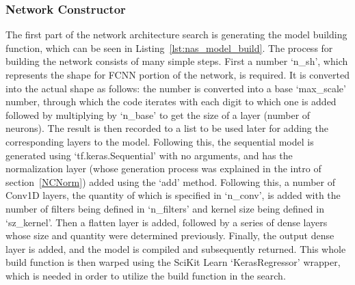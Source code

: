 \documentclass[12pt,letterpaper,oneside,reqno]{book}
\theoremstyle{plain}
\theoremstyle{definition}
\theoremstyle{plain}
\theoremstyle{remark}
\theoremstyle{plain}
\theoremstyle{definition}
\theoremstyle{plain}
\begin{document}
\subsubsection{Network Constructor}
The first part of the network architecture search is generating the model building function, which can be seen in Listing~\ref{lst:nas_model_build}. The process for building the network consists of many simple steps. First a number `n\_sh', which represents the shape for FCNN portion of the network, is required. It is converted into the actual shape as follows: the number is converted into a base `max\_scale' number, through which the code iterates with each digit to which one is added followed by multiplying by `n\_base' to get the size of a layer (number of neurons). The result is then recorded to a list to be used later for adding the corresponding layers to the model. Following this, the sequential model is generated using `tf.keras.Sequential' with no arguments, and has the normalization layer (whose generation process was explained in the intro of section~\ref{NCNorm}) added using the `add' method. Following this, a number of Conv1D layers, the quantity of which is specified in `n\_conv', is added with the number of filters being defined in `n\_filters' and kernel size being defined in `sz\_kernel'. Then a flatten layer is added, followed by a series of dense layers whose size and quantity were determined previously. Finally, the output dense layer is added, and the model is compiled and subsequently returned. This whole build function is then warped using the SciKit Learn `KerasRegressor' wrapper, which is needed in order to utilize the build function in the search.  
\end{document}
